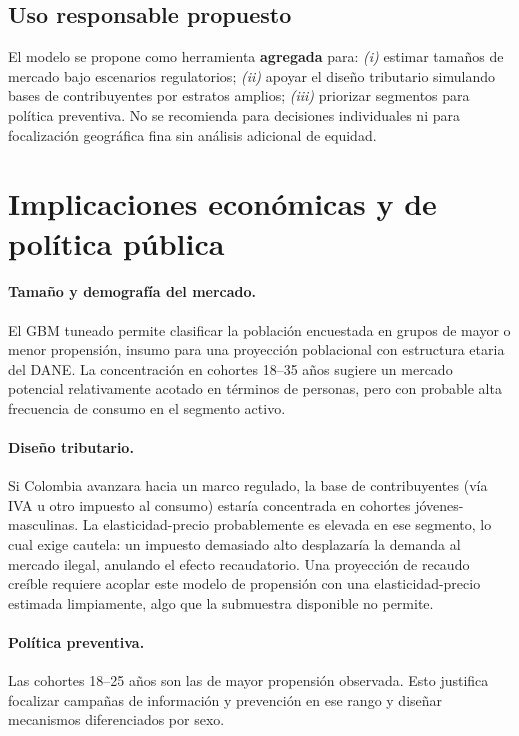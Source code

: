 \documentclass[12pt, a4paper]{article}
\begin{document}
\subsection{Uso responsable propuesto}

El modelo se propone como herramienta \textbf{agregada} para: \emph{(i)} estimar tamaños de mercado bajo escenarios regulatorios; \emph{(ii)} apoyar el diseño tributario simulando bases de contribuyentes por estratos amplios; \emph{(iii)} priorizar segmentos para política preventiva. No se recomienda para decisiones individuales ni para focalización geográfica fina sin análisis adicional de equidad.

\section{Implicaciones económicas y de política pública}\label{sec:implicaciones}

\paragraph{Tamaño y demografía del mercado.} El GBM tuneado permite clasificar la población encuestada en grupos de mayor o menor propensión, insumo para una proyección poblacional con estructura etaria del DANE. La concentración en cohortes 18--35 años sugiere un mercado potencial relativamente acotado en términos de personas, pero con probable alta frecuencia de consumo en el segmento activo.

\paragraph{Diseño tributario.} Si Colombia avanzara hacia un marco regulado, la base de contribuyentes (vía IVA u otro impuesto al consumo) estaría concentrada en cohortes jóvenes-masculinas. La elasticidad-precio probablemente es elevada en ese segmento, lo cual exige cautela: un impuesto demasiado alto desplazaría la demanda al mercado ilegal, anulando el efecto recaudatorio. Una proyección de recaudo creíble requiere acoplar este modelo de propensión con una elasticidad-precio estimada limpiamente, algo que la submuestra disponible no permite.

\paragraph{Política preventiva.} Las cohortes 18--25 años son las de mayor propensión observada. Esto justifica focalizar campañas de información y prevención en ese rango y diseñar mecanismos diferenciados por sexo.
\end{document}
